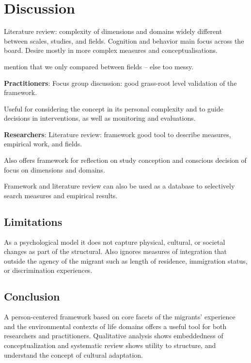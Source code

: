 \documentclass[man, 12pt, a4paper]{apa7}
\begin{document}
\section{Discussion}

Literature review: complexity of dimensions and domains widely different between scales, studies, and fields. Cognition and behavior main focus across the board. Desire mostly in more complex measures and conceptualisations.

mention that we only compared between fields -- else too messy.

\vspace{1em}
\textbf{Practitioners}: Focus group discussion: good grass-root level validation of the framework.

Useful for considering the concept in its personal complexity and to guide decisions in interventions, as well as monitoring and evaluations. 

\textbf{Researchers}: Literature review: framework good tool to describe measures, empirical work, and fields.

Also offers framework for reflection on study conception and conscious decision of focus on dimensions and domains.

Framework and literature review can also be used as a database to selectively search measures and empirical results.
\subsection{Limitations}
As a psychological model it does not capture physical, cultural, or societal changes as part of the structural. Also ignores measures of integration that outside the agency of the migrant such as length of residence, immigration status, or discrimination experiences.

\subsection{Conclusion}
A person-centered framework based on core facets of the migrants’ experience and the environmental contexts of life domains offers a useful tool for both researchers and practitioners. Qualitative analysis shows embeddedness of conceptualization and systematic review shows utility to structure, and understand the concept of cultural adaptation.
\end{document}
